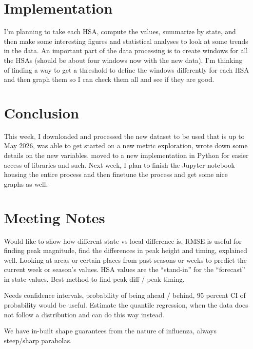 \documentclass{article}
\begin{document}
\section{Implementation}
I'm planning to take each HSA, compute the values, summarize by state, and then make some interesting figures and statistical analyses to look at some trends in the data. An important part of the data processing is to create windows for all the HSAs (should be about four windows now with the new data). I'm thinking of finding a way to get a threshold to define the windows differently for each HSA and then graph them so I can check them all and see if they are good.

\section{Conclusion}
This week, I downloaded and processed the new dataset to be used that is up to May 2026, was able to get started on a new metric exploration, wrote down some details on the new variables, moved to a new implementation in Python for easier access of libraries and such. Next week, I plan to finish the Jupyter notebook housing the entire process and then finetune the process and get some nice graphs as well.

\section{Meeting Notes}
Would like to show how different state vs local difference is, RMSE is useful for finding peak magnitude, find the differences in peak height and timing, explained well. Looking at areas or certain places from past seasons or weeks to predict the current week or season's values. HSA values are the ``stand-in'' for the ``forecast'' in state values. Best method to find peak diff / peak timing.

Needs confidence intervals, probability of being ahead / behind, 95 percent CI of probability would be useful. Estimate the quantile regression, when the data does not follow a distribution and can do this way instead. 

We have in-built shape guarantees from the nature of influenza, always steep/sharp parabolas.
\end{document}
